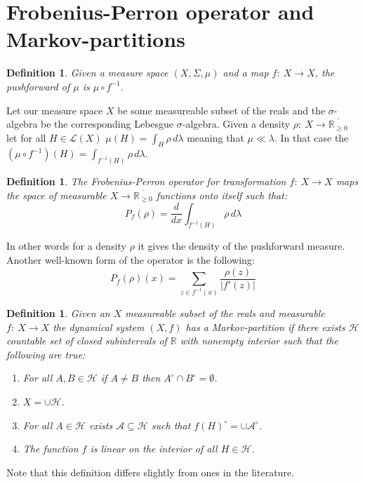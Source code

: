 \documentclass{article}
\newtheorem{defin}[theorem]{Definition}
\begin{document}
\section{Frobenius-Perron operator and Markov-partitions}

\begin{defin}
Given a measure space $(X, \Sigma, \mu)$ and a map $f:\: X \rightarrow X$, the pushforward of $\mu$ is $\mu \circ f^{-1}$.
\end{defin}

Let our measure space $X$ be some measureable subset of the reals and the $\sigma$-algebra be the corresponding Lebesgue $\sigma$-algebra. Given a density $\rho :\: X \rightarrow \overline{\mathbb{R}_{\geq 0}}$ let for all $H \in \mathscr{L}( X )$ $\mu(H) = \int_H \rho\, d\lambda$ meaning that $\mu \ll \lambda$. In that case the $(\mu \circ f^{-1})(H) = \int_{f^{-1}(H)} \rho\, d\lambda$.

\begin{defin}
The Frobenius-Perron operator for transformation $f:\: X \rightarrow X$ maps the space of measurable $X \rightarrow \overline{\mathbb{R}_{\geq 0}}$ functions onto itself such that:\[
P_f(\rho) = \frac{d}{dx} \int_{f^{-1}(H)} \rho\, d\lambda
\] 
\end{defin}

In other words for a density $\rho$ it gives the density of the pushforward measure. Another well-known form of the operator is the following:\[
P_f(\rho)(x) = \sum_{z \in f^{-1}(x)} \frac{\rho(z)}{|f'(z)|}
\]

\begin{defin} \label{Markovpart}
Given an $X$ measureable subset of the reals  and measurable $f:\: X\rightarrow X$ the dynamical system $(X, f)$ has a Markov-partition if there exists $\mathscr{H}$ countable set of closed subintervals of $\mathbb{R}$ with nonempty interior such that the following are true:
\begin{enumerate}
\item For all $A, B \in \mathscr{H}$ if $A \neq B$ then $A^\circ \cap B^\circ = \emptyset$.
\item $X = \cup \mathscr{H}$.
\item For all $A \in \mathscr{H}$ exists $\mathscr{A} \subseteq \mathscr{H}$ such that $f(H)^\circ = \cup \mathscr{A}^\circ$.
\item The function $f$ is linear on the interior of all $H \in \mathscr{H}$.
\end{enumerate}
\end{defin}
Note that this definition differs slightly from ones in the literature.
\end{document}
